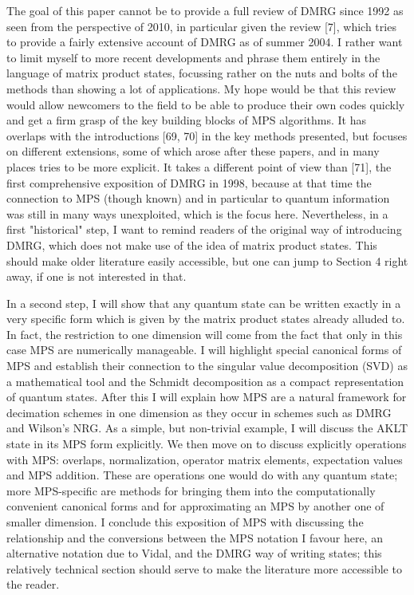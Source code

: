 \documentclass[12pt]{article}
\begin{document}
The goal of this paper cannot be to provide a full review of DMRG since 1992 as seen from the perspective of 2010, in particular given the review [7], which tries to provide a fairly extensive account of DMRG as of summer 2004. I rather want to limit myself to more recent developments and phrase them entirely in the language of matrix product states, focussing rather on the nuts and bolts of the methods than showing a lot of applications. My hope would be that this review would allow newcomers to the field to be able to produce their own codes quickly and get a firm grasp of the key building blocks of MPS algorithms. It has overlaps with the introductions [69, 70] in the key methods presented, but focuses on different extensions, some of which arose after these papers, and in many places tries to be more explicit. It takes a different point of view than [71], the first comprehensive exposition of DMRG in 1998, because at that time the connection to MPS (though known) and in particular to quantum information was still in many ways unexploited, which is the focus here. Nevertheless, in a first "historical" step, I want to remind readers of the original way of introducing DMRG, which does not make use of the idea of matrix product states. This should make older literature easily accessible, but one can jump to Section 4 right away, if one is not interested in that.

In a second step, I will show that any quantum state can be written exactly in a very specific form which is given by the matrix product states already alluded to. In fact, the restriction to one dimension will come from the fact that only in this case MPS are numerically manageable. I will highlight special canonical forms of MPS and establish their connection to the singular value decomposition (SVD) as a mathematical tool and the Schmidt decomposition as a compact representation of quantum states. After this I will explain how MPS are a natural framework for decimation schemes in one dimension as they occur in schemes such as DMRG and Wilson's NRG. As a simple, but non-trivial example, I will discuss the AKLT state in its MPS form explicitly. We then move on to discuss explicitly operations with MPS: overlaps, normalization, operator matrix elements, expectation values and MPS addition. These are operations one would do with any quantum state; more MPS-specific are methods for bringing them into the computationally convenient canonical forms and for approximating an MPS by another one of smaller dimension. I conclude this exposition of MPS with discussing the relationship and the conversions between the MPS notation I favour here, an alternative notation due to Vidal, and the DMRG way of writing states; this relatively technical section should serve to make the literature more accessible to the reader.
\end{document}
